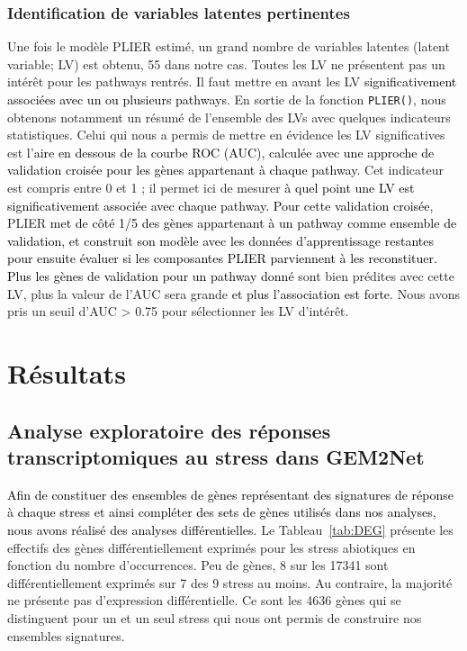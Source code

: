 \documentclass[twoside]{article}
\newcommand{\AR}[1]{\textcolor{black}{#1}}
\begin{document}
    
\subsubsection{Identification de variables latentes pertinentes}
        
    \vspace{0.5cm}Une fois le modèle PLIER estimé, un grand nombre de variables latentes (latent variable; LV) est obtenu, 55 dans notre cas. Toutes les LV ne présentent pas un intérêt pour les pathways rentrés. Il faut mettre en avant les LV \AR{significativement associées avec un ou plusieurs pathways}. En sortie de la fonction \texttt{PLIER()}, nous obtenons notamment un résumé de l'ensemble des LVs avec quelques indicateurs statistiques. Celui qui nous a permis de mettre en évidence les LV significatives est \AR{l'aire en dessous de la courbe ROC (AUC), calculée avec une approche de validation croisée pour les gènes appartenant à chaque pathway}. Cet indicateur est compris entre 0 et 1 ; il permet ici de mesurer \AR{à quel point une LV est significativement associée avec chaque pathway. Pour cette validation croisée}, PLIER \AR{met de côté 1/5 des gènes appartenant à un pathway comme ensemble de validation, et construit son modèle avec les données d'apprentissage
    restantes pour ensuite évaluer si les composantes PLIER parviennent à les reconstituer. Plus les gènes de validation pour un pathway donné} sont bien prédites avec cette LV, plus la valeur de l'AUC sera grande \AR{et plus l'association est forte}. Nous avons pris un seuil d'AUC > 0.75 pour sélectionner les LV d'intérêt.

\newpage
\section{\textbf{Résultats}}
    \subsection{Analyse exploratoire des réponses transcriptomiques au stress dans GEM2Net}

\vspace{0.5cm}\AR{Afin de constituer des ensembles de gènes représentant des signatures de réponse à chaque stress et ainsi compléter des sets de gènes utilisés dans nos analyses, nous avons réalisé des analyses différentielles}. Le Tableau~\ref{tab:DEG} présente les effectifs des gènes différentiellement exprimés pour les stress abiotiques en fonction du nombre d'occurrences. Peu de gènes, 8 sur les 17341 sont différentiellement exprimés sur 7 des 9 stress au moins. Au contraire, la majorité ne présente pas d'expression différentielle. Ce sont les 4636 gènes qui se distinguent pour un et un seul stress qui nous ont permis de construire nos ensembles signatures.
\end{document}
